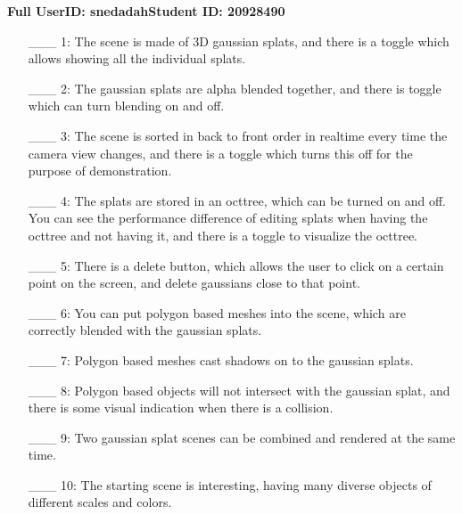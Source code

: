 \documentclass {article}
\begin{document}
\newpage



{\hfill{\bf Full UserID: snedadah}\hfill{\bf Student ID: 20928490}\hfill}

\begin{enumerate}
     \item[\_\_\_ 1:] The scene is made of 3D gaussian splats, and there is a toggle which allows showing all the individual splats.
     
     \item[\_\_\_ 2:] The gaussian splats are alpha blended together, and there is toggle which can turn blending on and off.

     \item[\_\_\_ 3:] The scene is sorted in back to front order in realtime every time the camera view changes, and there is a toggle which turns this off for the purpose of demonstration.

     \item[\_\_\_ 4:] The splats are stored in an octtree, which can be turned on and off. You can see the performance difference of editing splats when having the octtree and not having it, and there is a toggle to visualize the octtree.

     \item[\_\_\_ 5:]  There is a delete button, which allows the user to click on a certain point on the screen, and delete gaussians close to that point.

     \item[\_\_\_ 6:] You can put polygon based meshes into the scene, which are correctly blended with the gaussian splats.

     \item[\_\_\_ 7:] Polygon based meshes cast shadows on to the gaussian splats.

     \item[\_\_\_ 8:] Polygon based objects will not intersect with the gaussian splat, and there is some visual indication when there is a collision.

     \item[\_\_\_ 9:]  Two gaussian splat scenes can be combined and rendered at the same time.

     \item[\_\_\_ 10:] The starting scene is interesting, having many diverse objects of different scales and colors.


\end{enumerate}

\end{document}
